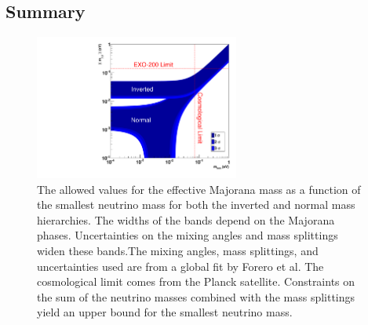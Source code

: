 \documentclass[herrin-thesis.tex]{subfiles}
\begin{document}
\subsection{Summary}

\begin{figure}
	\centering
	\includegraphics[width=0.6\textwidth]{./plots/nu_meff_v_mmin.pdf}
	\caption[Effective Majorana mass vs. smallest neutrino mass]{The allowed values for the effective Majorana mass as a function of the smallest neutrino mass for both the inverted and normal mass hierarchies. The widths of the bands depend on the Majorana phases. Uncertainties on the mixing angles and mass splittings widen these bands.The mixing angles, mass splittings, and uncertainties used are from a global fit by Forero et al.\cite{Forero:2012cr} The cosmological limit comes from the Planck satellite. Constraints on the sum of the neutrino masses combined with the mass splittings yield an upper bound for the smallest neutrino mass.}
	\label{fig:nu_meff_v_mmin}
\end{figure}\addref
\end{document}
